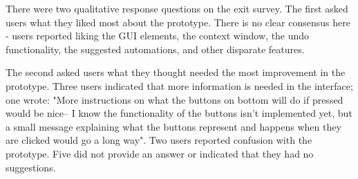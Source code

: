 There were two qualitative response questions on the exit survey. The first
asked users what they liked most about the prototype. There is no clear
consensus here - users reported liking the GUI elements, the context window, the
undo functionality, the suggested automations, and other disparate features.

The second asked users what they thought needed the most improvement in the
prototype. Three users indicated that more information is needed in the
interface; one wrote: "More instructions on what the buttons on bottom will do
if pressed would be nice-- I know the functionality of the buttons isn't
implemented yet, but a small message explaining what the buttons represent and
happens when they are clicked would go a long way". Two users reported confusion
with the prototype. Five did not provide an answer or indicated that they had no
suggestions.

